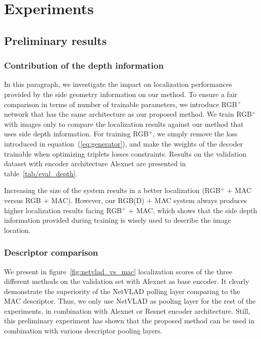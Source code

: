 \section{Experiments}
\label{sec:experiments}





\subsection{Preliminary results}
\subsubsection{Contribution of the depth information}
In this paragraph, we investigate the impact on localization performances provided by the side geometry information on our method. To ensure a fair comparison in terms of number of trainable parameters, we introduce RGB$^+$ network that has the same architecture as our proposed method. We train RGB$^+$ with images only to compare the localization results against our method that uses side depth information. For training RGB$^+$, we simply remove the loss introduced in equation~(\ref{eq:generator}), and make the weights of the decoder trainable when optimizing triplets losses constraints. Results on the validation dataset with encoder architecture Alexnet are presented in table~\ref{tab/eval_depth}.

Increasing the size of the system results in a better localization (RGB$^{+}$ + MAC versus RGB + MAC). However, our RGB(D) + MAC system always produces higher localization results facing RGB$^{+}$ + MAC, which shows that the side depth information provided during training is wisely used to describe the image location.

\subsubsection{Descriptor comparison}
We present in figure~\ref{fig:netvlad_vs_mac} localization scores of the three different methods on the validation set with Alexnet as base encoder. It clearly demonstrate the superiority of the NetVLAD polling layer comparing to the MAC descriptor. Thus, we only use NetVLAD as pooling layer for the rest of the experiments, in combination with Alexnet or Resnet encoder architecture. Still, this preliminary experiment has shown that the proposed method can be used in combination with various descriptor pooling layers.


